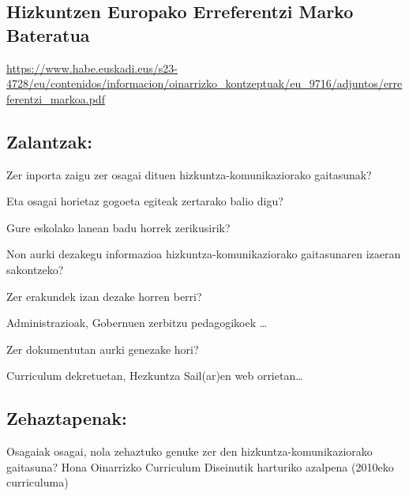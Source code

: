 \documentclass[
]{book}
\begin{document}
\hypertarget{hizkuntzen-europako-erreferentzi-marko-bateratua}{%
\subsection{Hizkuntzen Europako Erreferentzi Marko Bateratua}\label{hizkuntzen-europako-erreferentzi-marko-bateratua}}

\url{https://www.habe.euskadi.eus/s23-4728/eu/contenidos/informacion/oinarrizko_kontzeptuak/eu_9716/adjuntos/erreferentzi_markoa.pdf}

\hypertarget{zalantzak}{%
\subsection{Zalantzak:}\label{zalantzak}}

Zer inporta zaigu zer osagai dituen hizkuntza-komunikaziorako gaitasunak?

Eta osagai horietaz gogoeta egiteak zertarako balio digu?

Gure eskolako lanean badu horrek zerikusirik?

Non aurki dezakegu informazioa hizkuntza-komunikaziorako gaitasunaren izaeran sakontzeko?

Zer erakundek izan dezake horren berri?

Administrazioak, Gobernuen zerbitzu pedagogikoek \ldots{}

Zer dokumentutan aurki genezake hori?

Curriculum dekretuetan, Hezkuntza Sail(ar)en web orrietan\ldots{}

\hypertarget{zehaztapenak}{%
\subsection{Zehaztapenak:}\label{zehaztapenak}}

Osagaiak osagai, nola zehaztuko genuke zer den hizkuntza-komunikaziorako gaitasuna?
Hona Oinarrizko Curriculum Diseinutik harturiko azalpena (2010eko curriculuma)
\end{document}
